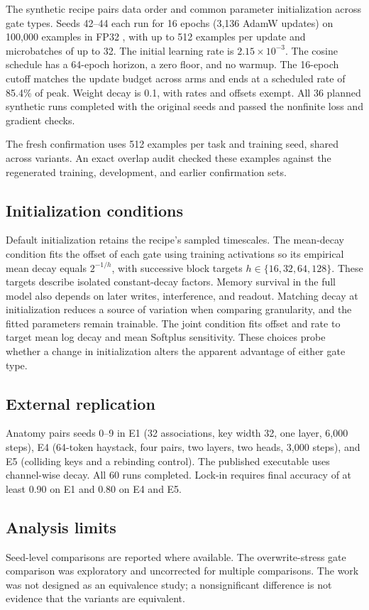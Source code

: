 \documentclass[conference]{IEEEtran}
\begin{document}
The synthetic recipe pairs data order and common parameter initialization across gate types. Seeds 42--44 each run for 16 epochs (3,136 AdamW updates) on 100,000 examples in FP32 \cite{loshchilov2019adamw}, with up to 512 examples per update and microbatches of up to 32. The initial learning rate is $2.15\times10^{-3}$. The cosine schedule has a 64-epoch horizon, a zero floor, and no warmup. The 16-epoch cutoff matches the update budget across arms and ends at a scheduled rate of 85.4\% of peak. Weight decay is 0.1, with rates and offsets exempt. All 36 planned synthetic runs completed with the original seeds and passed the nonfinite loss and gradient checks.

The fresh confirmation uses 512 examples per task and training seed, shared across variants. An exact overlap audit checked these examples against the regenerated training, development, and earlier confirmation sets.

\subsection{Initialization conditions}
Default initialization retains the recipe's sampled timescales. The mean-decay condition fits the offset of each gate using training activations so its empirical mean decay equals $2^{-1/h}$, with successive block targets $h \in \{16,32,64,128\}$. These targets describe isolated constant-decay factors. Memory survival in the full model also depends on later writes, interference, and readout. Matching decay at initialization reduces a source of variation when comparing granularity, and the fitted parameters remain trainable. The joint condition fits offset and rate to target mean log decay and mean Softplus sensitivity. These choices probe whether a change in initialization alters the apparent advantage of either gate type.

\subsection{External replication}
Anatomy pairs seeds 0--9 in E1 (32 associations, key width 32, one layer, 6,000 steps), E4 (64-token haystack, four pairs, two layers, two heads, 3,000 steps), and E5 (colliding keys and a rebinding control). The published executable uses channel-wise decay. All 60 runs completed. Lock-in requires final accuracy of at least 0.90 on E1 and 0.80 on E4 and E5.

\subsection{Analysis limits}
Seed-level comparisons are reported where available. The overwrite-stress gate comparison was exploratory and uncorrected for multiple comparisons. The work was not designed as an equivalence study; a nonsignificant difference is not evidence that the variants are equivalent.
\end{document}
